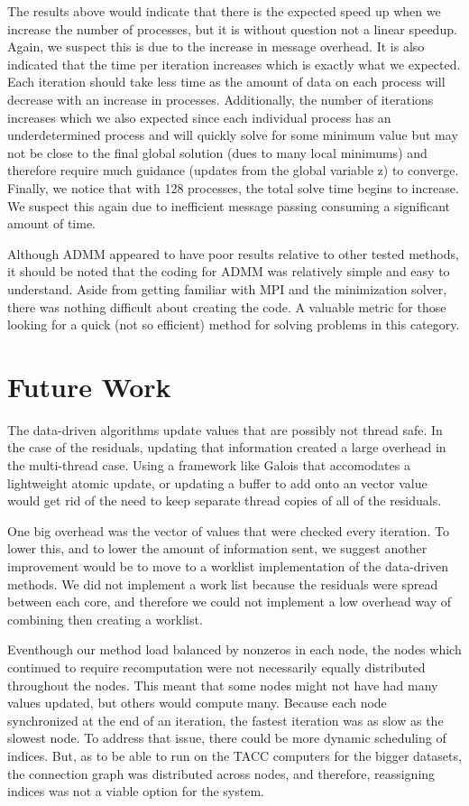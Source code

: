 \documentclass[letterpaper,11pt,onecolumn]{article}
\begin{document}
The results above would indicate that there is the expected speed up when we increase the number of processes, but it is without question not a linear speedup. Again, we suspect this is due to the increase in message overhead. It is also indicated that the time per iteration increases which is exactly what we expected. Each iteration should take less time as the amount of data on each process will decrease with an increase in processes. Additionally, the number of iterations increases which we also expected since each individual process has an underdetermined process and will quickly solve for some minimum value but may not be close to the final global solution (dues to many local minimums) and therefore require much guidance (updates from the global variable z) to converge. Finally, we notice that with 128 processes, the total solve time begins to increase. We suspect this again due to inefficient message passing consuming a significant amount of time.


Although ADMM appeared to have poor results relative to other tested methods, it should be noted that the coding for ADMM was relatively simple and easy to understand. Aside from getting familiar with MPI and the minimization solver, there was nothing difficult about creating the code. A valuable metric for those looking for a quick (not so efficient) method for solving problems in this category.


\section{Future Work}

The data-driven algorithms update values that are possibly not thread safe. In the case of the residuals, updating that information created a large overhead in the multi-thread case. Using a framework like Galois that accomodates a lightweight atomic update, or updating a buffer to add onto an vector value would get rid of the need to keep separate thread copies of all of the residuals.

One big overhead was the vector of values that were checked every iteration. To lower this, and to lower the amount of information sent, we suggest another improvement would be to move to a worklist implementation of the data-driven methods. We did not implement a work list because the residuals were spread between each core, and therefore we could not implement a low overhead way of combining then creating a worklist.

Eventhough our method load balanced by nonzeros in each node, the nodes which continued to require recomputation were not necessarily equally distributed throughout the nodes. This meant that some nodes might not have had many values updated, but others would compute many. Because each node synchronized at the end of an iteration, the fastest iteration was as slow as the slowest node. To address that issue, there could be more dynamic scheduling of indices. But, as to be able to run on the TACC computers for the bigger datasets, the connection graph was distributed across nodes, and therefore, reassigning indices was not a viable option for the system.
\end{document}
